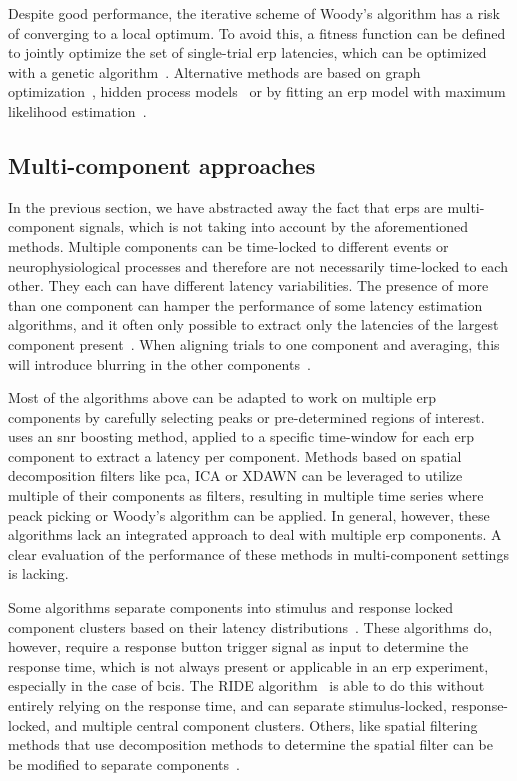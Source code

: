 Despite good performance, the iterative scheme of Woody's algorithm has a risk of converging to a local
optimum.
To avoid this, a fitness function can be defined to jointly optimize
the set of single-trial \ac{erp} latencies, which can be optimized with a genetic algorithm~\cite{Pelo2018}.
Alternative methods are based on graph
optimization~\cite{Dimitriadis2018}, hidden process models~\cite{Kim2020} or by fitting an \ac{erp} model with
maximum likelihood estimation~\cite{Gratton1989, Tuan1987, Moecks1988,Puce1994}.

\subsection{Multi-component approaches}
\label{sec:wcble/literature/multi-comp}
In the previous section, we have abstracted away the fact that \acp{erp} are
multi-component signals, which is not taking into account by the aforementioned
methods.
Multiple components can be time-locked to different events or neurophysiological
processes and therefore are not necessarily time-locked to each other. They
each can have different latency variabilities.
The presence of more than one component can hamper the
performance of some latency estimation algorithms, and it often only possible to extract only the
latencies of the largest component present~\cite{Ouyang2017}. When aligning trials
to one component and averaging, this will introduce blurring in the other
components~\cite{Ouyang2020}.

Most of the algorithms above can be adapted to work on multiple \ac{erp} components
by carefully selecting peaks or pre-determined regions of interest.
\cite{Hardiansyah2020} uses an \ac{snr} boosting method, applied to a specific
time-window for each \ac{erp} component to extract a latency per component.
Methods based on spatial decomposition filters like \ac{pca}, ICA or XDAWN can be leveraged
to utilize multiple of their components as filters, resulting in multiple time
series where peack picking or Woody's algorithm can be applied. In general,
however, these algorithms lack an integrated approach to deal with multiple
\ac{erp} components. A clear evaluation of the performance of these
methods in multi-component settings is lacking.

Some algorithms separate components into stimulus and response locked component clusters based on their
latency distributions~\cite{Jung2001, Takeda2008,	Zhang1998, Yin2009}.
These algorithms do, however, require a response
button trigger signal as input to determine the response time, which is
not always present or applicable in an \ac{erp} experiment, especially in
the case of \acp{bci}.
The RIDE algorithm~\cite{Ouyang2011, Ouyang2015,	Wang2015, Ouyang2016, Ouyang2020}
is able to do this without entirely relying on the response time, and can
separate stimulus-locked, response-locked, and multiple central component clusters.
Others, like spatial filtering methods that use decomposition methods to
determine the spatial filter can be be modified to separate
components~\cite{Ouyang2017}.

